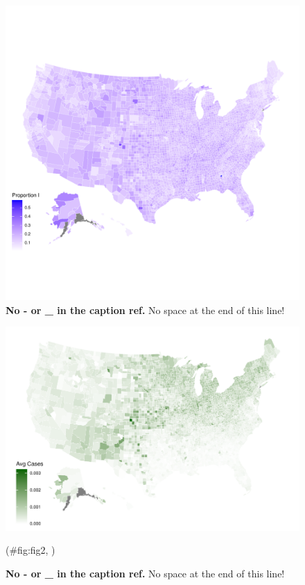 \documentclass[
  12pt,
]{article}
\begin{document}
\begin{figure}[H]

{\centering \includegraphics{Final-Manuscript_files/figure-latex/fig1-1} 

}

\caption{\textbf{No - or \_ in the caption ref.} No space at the end of this line!}\label{fig:fig1}
\end{figure}



\begin{figure}[H]

{\centering \includegraphics[width=0.7\linewidth,]{Final-Manuscript_files/figure-latex/fig2, -1} 

}

\caption{\textbf{No - or \_ in the caption ref.} No space at the end of this line!}(\#fig:fig2, )
\end{figure}
\end{document}
